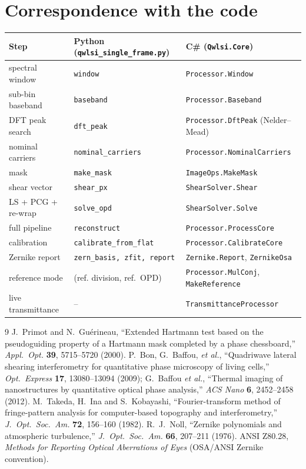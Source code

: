 \documentclass[11pt,a4paper]{article}
\theoremstyle{definition}
\newcommand{\code}[1]{\texttt{\small #1}}
\begin{document}
\section{Correspondence with the code}
\label{app:map}
\begin{center}
\begin{tabular}{lll}
\toprule
Step & Python (\code{qwlsi\_single\_frame.py}) & C\# (\code{Qwlsi.Core}) \\
\midrule
spectral window & \code{window} & \code{Processor.Window} \\
sub-bin baseband & \code{baseband} & \code{Processor.Baseband} \\
DFT peak search & \code{dft\_peak} & \code{Processor.DftPeak} (Nelder--Mead) \\
nominal carriers & \code{nominal\_carriers} & \code{Processor.NominalCarriers} \\
mask & \code{make\_mask} & \code{ImageOps.MakeMask} \\
shear vector & \code{shear\_px} & \code{ShearSolver.Shear} \\
LS + PCG + re-wrap & \code{solve\_opd} & \code{ShearSolver.Solve} \\
full pipeline & \code{reconstruct} & \code{Processor.ProcessCore} \\
calibration & \code{calibrate\_from\_flat} & \code{Processor.CalibrateCore} \\
Zernike report & \code{zern\_basis, zfit, report} & \code{Zernike.Report}, \code{ZernikeOsa} \\
reference mode & (ref. division, ref.\ OPD) & \code{Processor.MulConj}, \code{MakeReference} \\
live transmittance & -- & \code{TransmittanceProcessor} \\
\bottomrule
\end{tabular}
\end{center}

\begin{thebibliography}{9}
 J.~Primot and N.~Guérineau, ``Extended Hartmann test based on the pseudoguiding property of a Hartmann mask completed by a phase chessboard,'' \emph{Appl.\ Opt.} \textbf{39}, 5715--5720 (2000).
 P.~Bon, G.~Baffou, \emph{et al.}, ``Quadriwave lateral shearing interferometry for quantitative phase microscopy of living cells,'' \emph{Opt.\ Express} \textbf{17}, 13080--13094 (2009); G.~Baffou \emph{et al.}, ``Thermal imaging of nanostructures by quantitative optical phase analysis,'' \emph{ACS Nano} \textbf{6}, 2452--2458 (2012).
 M.~Takeda, H.~Ina and S.~Kobayashi, ``Fourier-transform method of fringe-pattern analysis for computer-based topography and interferometry,'' \emph{J.\ Opt.\ Soc.\ Am.} \textbf{72}, 156--160 (1982).
 R.~J.~Noll, ``Zernike polynomials and atmospheric turbulence,'' \emph{J.\ Opt.\ Soc.\ Am.} \textbf{66}, 207--211 (1976).
 ANSI Z80.28, \emph{Methods for Reporting Optical Aberrations of Eyes} (OSA/ANSI Zernike convention).
\end{thebibliography}
\end{document}
